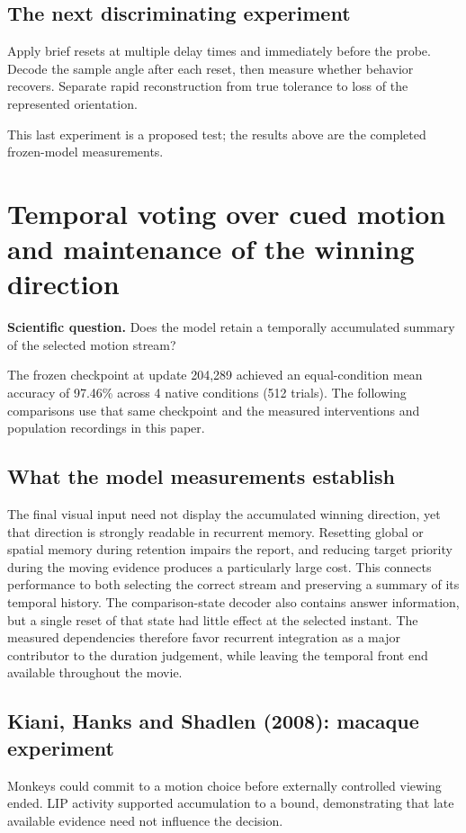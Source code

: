 \documentclass[11pt]{article}
\begin{document}
\subsection{The next discriminating experiment}
Apply brief resets at multiple delay times and immediately before the probe. Decode the sample angle after each reset, then measure whether behavior recovers. Separate rapid reconstruction from true tolerance to loss of the represented orientation.

This last experiment is a proposed test; the results above are the completed frozen-model measurements.
\clearpage\section{Temporal voting over cued motion and maintenance of the winning direction}
\textbf{Scientific question.} Does the model retain a temporally accumulated summary of the selected motion stream?

The frozen checkpoint at update 204,289 achieved an equal-condition mean accuracy of 97.46\% across 4 native conditions (512 trials). The following comparisons use that same checkpoint and the measured interventions and population recordings in this paper.

\subsection{What the model measurements establish}
The final visual input need not display the accumulated winning direction, yet that direction is strongly readable in recurrent memory. Resetting global or spatial memory during retention impairs the report, and reducing target priority during the moving evidence produces a particularly large cost. This connects performance to both selecting the correct stream and preserving a summary of its temporal history. The comparison-state decoder also contains answer information, but a single reset of that state had little effect at the selected instant. The measured dependencies therefore favor recurrent integration as a major contributor to the duration judgement, while leaving the temporal front end available throughout the movie.

\subsection{Kiani, Hanks and Shadlen (2008): macaque experiment}
Monkeys could commit to a motion choice before externally controlled viewing ended. LIP activity supported accumulation to a bound, demonstrating that late available evidence need not influence the decision. \cite{bio_kiani}
\end{document}
